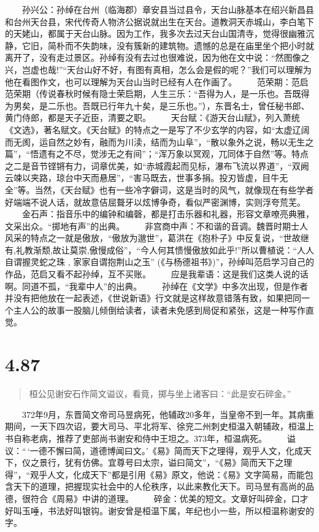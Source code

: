 \documentclass[]{book}
\begin{document}
　　孙兴公：孙绰在台州（临海郡）章安县当过县令，天台山脉基本在绍兴新昌县和台州天台县，宋代传奇人物济公据说就出生在天台。道教洞天赤城山，李白笔下的天姥山，都属于天台山脉。因为工作，我多次去过天台山国清寺，觉得很幽雅沉静，它旧，简朴而不失韵味，没有簇新的建筑物。遗憾的总是在庙里坐个把小时就离开了，没有走过景区。孙绰有没有去过也很难说，因为他在文中说：``然图像之兴，岂虚也哉!''``天台山好不好，有图有真相，怎么会是假的呢？''我们可以理解为他在看图作文，也可以理解为天台山当时已经有人在作画了。
　　范荣期：范启范荣期（传说春秋时候有隐士荣启期，人生三乐：``吾得为人，是一乐也。吾既得为男矣，是二乐也。吾既已行年九十矣，是三乐也。''），东晋名士，曾任秘书郎、黄门侍郎，都是天子近臣，清要之职。
　　天台赋：《游天台山赋》，列入萧统《文选》，著名赋文。《天台赋》的特点之一是写了不少玄学的内容，如``太虚辽阔而无阂，运自然之妙有，融而为川渎，结而为山阜''，``散以象外之说，畅以无生之篇''，``悟遗有之不尽，觉涉无之有间''；``浑万象以冥观，兀同体于自然''等。特点之二是音节铿锵有力，词章优美，如``赤城霞起而见标，瀑布飞流以界道''，``双阙云竦以夹路，琼台中天而悬居''，``害马既去，世事多捐。投刃皆虚，目牛无全''等。当然，《天台赋》也有一些冷字僻词，这是当时的风气，就像现在有些学者好端端不说人话，就故意佶屈聱牙以炫博争奇，看似严密渊博，实则浮夸荒芜。
　　金石声：指音乐中的编钟和编磬，都是打击乐器和礼器，形容文章嘹亮典雅，文采出众。``掷地有声''的出典。
　　非宫商中声：不和谐的音调。魏晋时期士人风采的特点之一就是傲放，``傲放为邈世''，葛洪在《抱朴子》中反复说，``世故继有,礼教渐颓,故让莫崇,傲慢成俗''，``今人何其愦慢傲放如此乎!''所以曹植说：``人人自谓握灵蛇之珠
, 家家自谓抱荆山之玉''
(《与杨德祖书》)''，孙绰叫范启学习自己的作品，范启又看不起孙绰，互不买账。
　　应是我辈语：这是我们这类人说的话啊。同道不孤，``我辈中人''的出典。
　　孙绰在《文学》中多次出现，但是作者并没有把他放在一起表述，《世说新语》行文就是这样故意错落有致，如果把同一个主人公的故事一股脑儿倾倒给读者，读者未免感到局促和紧张，这是一种写作直觉。

\section{4.87}\label{section-264}

\begin{quote}
桓公见谢安石作简文谥议，看竟，掷与坐上诸客曰：``此是安石碎金。''
\end{quote}

　　372年9月，东晋简文帝司马昱病死，他辅政20多年，当皇帝不到一年。其病重期间，一天下四次诏，要大司马、平北将军、徐兖二州刺史桓温入朝辅政，桓温上书自称老病，推荐了吏部尚书谢安和侍中王坦之。373年，桓温病死。
　　谥议：``\,`一德不懈曰简，道德博闻曰文。'《易》简而天下之理得，观乎人文，化成天下，仪之景行，犹有仿佛。宜尊号曰太宗，谥曰简文''，``《易》简而天下之理得''，``观乎人文，化成天下''都是引用《易》原文，他说：《易》文字简易，而能包含天下的道理，把握现实社会中的人伦秩序，以此来教化天下。司马昱有高尚的品德，很符合《周易》中讲的道理。
　　碎金：优美的短文。文章好叫碎金，口才好叫玉唾，书法好叫银钩。谢安曾是桓温下属，年纪也小一些，所以桓温称谢安的字。
\end{document}
